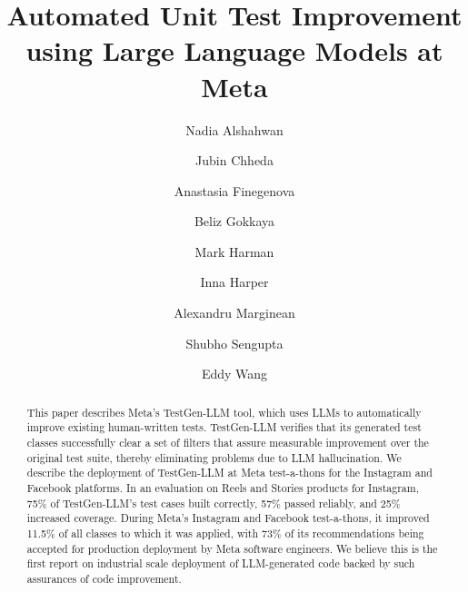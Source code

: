 \documentclass[sigconf,screen]{acmart}
\begin{document}
\title{Automated Unit Test Improvement using Large Language Models at Meta}


\author{Nadia Alshahwan}
\author{Jubin Chheda}
\author{Anastasia Finegenova}
\author{Beliz Gokkaya}
\author{Mark Harman}
\author{Inna Harper}
\author{Alexandru Marginean}
\author{Shubho Sengupta}
\author{Eddy Wang}

\renewcommand{\shortauthors}{Alshawan and Harman, et al.}

\begin{abstract}
This paper describes Meta's TestGen-LLM tool, which uses LLMs to automatically improve existing human-written tests. 
TestGen-LLM verifies that its generated test classes successfully clear a set of filters that assure measurable improvement over the original test suite, thereby eliminating problems due to LLM hallucination.
We describe the deployment of TestGen-LLM  at Meta test-a-thons for the Instagram and Facebook platforms. 
In an evaluation on Reels and Stories products for Instagram, 
75\% of TestGen-LLM's  test cases built correctly, 57\% passed reliably, and 25\% increased coverage.
During Meta's Instagram and Facebook test-a-thons, it improved 11.5\% of all classes to which it was applied, with 73\%  of its recommendations being accepted for production deployment by Meta software engineers.
We believe this is the first report on industrial scale deployment of LLM-generated code backed by such assurances of code improvement.
\end{abstract}
\end{document}
